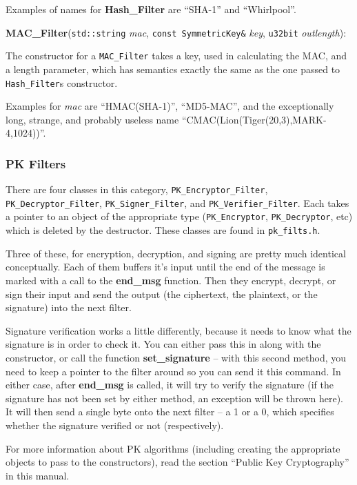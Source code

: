 \documentclass{article}
\newcommand{\filename}[1]{\texttt{#1}}
\newcommand{\function}[1]{\textbf{#1}}
\newcommand{\type}[1]{\texttt{#1}}
\renewcommand{\arg}[1]{\textsl{#1}}
\begin{document}
Examples of names for \function{Hash\_Filter} are ``SHA-1'' and ``Whirlpool''.

\noindent
\function{MAC\_Filter}(\type{std::string} \arg{mac},
                       \type{const SymmetricKey\&} \arg{key},
                       \type{u32bit} \arg{outlength}):

The constructor for a \type{MAC\_Filter} takes a key, used in calculating the
MAC, and a length parameter, which has semantics exactly the same as the one
passed to \type{Hash\_Filter}s constructor.

Examples for \arg{mac} are ``HMAC(SHA-1)'', ``MD5-MAC'', and the exceptionally
long, strange, and probably useless name
``CMAC(Lion(Tiger(20,3),MARK-4,1024))''.

\subsubsection{PK Filters}

There are four classes in this category, \type{PK\_Encryptor\_Filter},
\type{PK\_Decryptor\_Filter}, \type{PK\_Signer\_Filter}, and
\type{PK\_Verifier\_Filter}. Each takes a pointer to an object of the
appropriate type (\type{PK\_Encryptor}, \type{PK\_Decryptor}, etc) which is
deleted by the destructor. These classes are found in \filename{pk\_filts.h}.

Three of these, for encryption, decryption, and signing are pretty much
identical conceptually. Each of them buffers it's input until the end of the
message is marked with a call to the \function{end\_msg} function. Then they
encrypt, decrypt, or sign their input and send the output (the ciphertext, the
plaintext, or the signature) into the next filter.

Signature verification works a little differently, because it needs to know
what the signature is in order to check it. You can either pass this in along
with the constructor, or call the function \function{set\_signature} -- with
this second method, you need to keep a pointer to the filter around so you can
send it this command. In either case, after \function{end\_msg} is called, it
will try to verify the signature (if the signature has not been set by either
method, an exception will be thrown here). It will then send a single byte onto
the next filter -- a 1 or a 0, which specifies whether the signature verified
or not (respectively).

For more information about PK algorithms (including creating the appropriate
objects to pass to the constructors), read the section ``Public Key
Cryptography'' in this manual.
\end{document}
